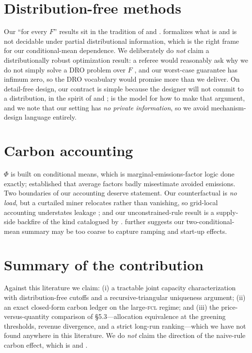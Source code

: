 \documentclass[11pt,reqno]{amsart}
\begin{document}
\section{Distribution-free methods}
Our ``for every $F$'' results sit in the tradition of \citet{Scarf1958} and
\citet{GallegoMoon1993}. \citet{PerakisRoels2008} formalizes what is and is not decidable
under partial distributional information, which is the right frame for our conditional-mean
dependence. We deliberately do \emph{not} claim a distributionally robust optimization
result: a referee would reasonably ask why we do not simply solve a DRO problem over $F$
\citep{DelageYe2010,WiesemannKuhnSim2014}, and our worst-case guarantee has infimum zero,
so the DRO vocabulary would promise more than we deliver. On detail-free design, our
contract is simple because the designer will not commit to a distribution, in the spirit of
\citet{Wilson1987} and \citet{BergemannMorris2005}; \citet{Carroll2015} is the model for how
to make that argument, and we note that our setting has \emph{no private information}, so we
avoid mechanism-design language entirely.

\section{Carbon accounting}
$\Phi$ is built on conditional means, which is marginal-emissions-factor logic done exactly;
\citet{SilerEvans2012} established that average factors badly misestimate avoided emissions.
Two boundaries of our accounting deserve statement. Our counterfactual is \emph{no load},
but a curtailed miner relocates rather than vanishing, so grid-local accounting understates
leakage \citep{Fowlie2009}; and our unconstrained-rule result is a supply-side backfire of
the kind catalogued by \citet{GillinghamRapsonWagner2016}. \citet{BushnellNovan2021} further
suggests our two-conditional-mean summary may be too coarse to capture ramping and start-up
effects.

\section{Summary of the contribution}
Against this literature we claim: (i) a tractable joint capacity characterization with
distribution-free cutoffs and a recursive-triangular uniqueness argument; (ii) an exact
closed-form carbon ledger on the large-\textsc{fcl} regime; and (iii) the price-versus-quantity
comparison of \S5.3---allocation equivalence at the greening thresholds, revenue divergence,
and a strict long-run ranking---which we have not found anywhere in this literature. We do
\emph{not} claim the direction of the naive-rule carbon effect, which is
\citet{KnittelSengaWang2025} and \citet{HollandMansur2008}.



\end{document}

